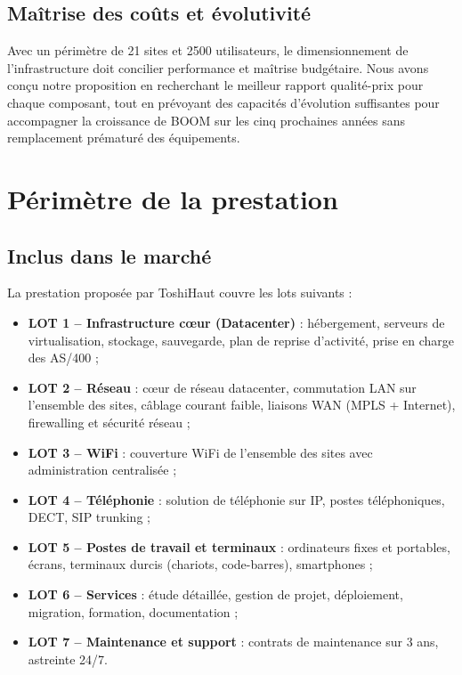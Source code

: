 \documentclass[12pt,a4paper]{report}
\begin{document}
\subsection{Maîtrise des coûts et évolutivité}

Avec un périmètre de 21 sites et 2500 utilisateurs, le dimensionnement de l'infrastructure doit concilier performance et maîtrise budgétaire. Nous avons conçu notre proposition en recherchant le meilleur rapport qualité-prix pour chaque composant, tout en prévoyant des capacités d'évolution suffisantes pour accompagner la croissance de BOOM sur les cinq prochaines années sans remplacement prématuré des équipements.

\section{Périmètre de la prestation}

\subsection{Inclus dans le marché}

La prestation proposée par ToshiHaut couvre les lots suivants :

\begin{itemize}
\item \textbf{LOT 1 -- Infrastructure c\oe ur (Datacenter)} : hébergement, serveurs de virtualisation, stockage, sauvegarde, plan de reprise d'activité, prise en charge des AS/400 ;
\item \textbf{LOT 2 -- Réseau} : c\oe ur de réseau datacenter, commutation LAN sur l'ensemble des sites, câblage courant faible, liaisons WAN (MPLS + Internet), firewalling et sécurité réseau ;
\item \textbf{LOT 3 -- WiFi} : couverture WiFi de l'ensemble des sites avec administration centralisée ;
\item \textbf{LOT 4 -- Téléphonie} : solution de téléphonie sur IP, postes téléphoniques, DECT, SIP trunking ;
\item \textbf{LOT 5 -- Postes de travail et terminaux} : ordinateurs fixes et portables, écrans, terminaux durcis (chariots, code-barres), smartphones ;
\item \textbf{LOT 6 -- Services} : étude détaillée, gestion de projet, déploiement, migration, formation, documentation ;
\item \textbf{LOT 7 -- Maintenance et support} : contrats de maintenance sur 3 ans, astreinte 24/7.
\end{itemize}
\end{document}
